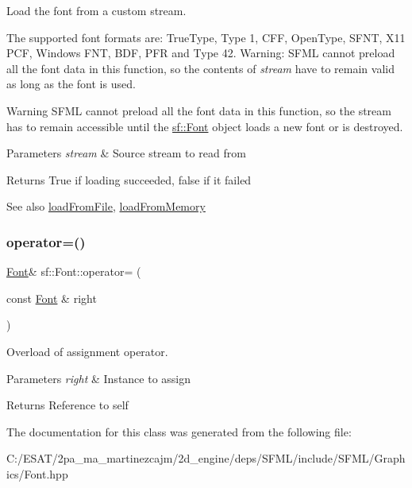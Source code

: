 Load the font from a custom stream. 

The supported font formats are\+: True\+Type, Type 1, C\+FF, Open\+Type, S\+F\+NT, X11 P\+CF, Windows F\+NT, B\+DF, P\+FR and Type 42. Warning\+: S\+F\+ML cannot preload all the font data in this function, so the contents of {\itshape stream} have to remain valid as long as the font is used.

\begin{DoxyWarning}{Warning}
S\+F\+ML cannot preload all the font data in this function, so the stream has to remain accessible until the \hyperlink{classsf_1_1_font}{sf\+::\+Font} object loads a new font or is destroyed.
\end{DoxyWarning}

\begin{DoxyParams}{Parameters}
{\em stream} & Source stream to read from\\
\hline
\end{DoxyParams}
\begin{DoxyReturn}{Returns}
True if loading succeeded, false if it failed
\end{DoxyReturn}
\begin{DoxySeeAlso}{See also}
\hyperlink{classsf_1_1_font_ab020052ef4e01f6c749a85571c0f3fd1}{load\+From\+File}, \hyperlink{classsf_1_1_font_abf2f8d6de31eb4e1db02e061c323e346}{load\+From\+Memory} 
\end{DoxySeeAlso}
\mbox{\label{classsf_1_1_font_a232515549846e3172a514d0b47918399}} 
\subsubsection{\texorpdfstring{operator=()}{operator=()}}
{\footnotesize\ttfamily \hyperlink{classsf_1_1_font}{Font}\& sf\+::\+Font\+::operator= (\begin{DoxyParamCaption}\item[{const \hyperlink{classsf_1_1_font}{Font} \&}]{right }\end{DoxyParamCaption})}



Overload of assignment operator. 


\begin{DoxyParams}{Parameters}
{\em right} & Instance to assign\\
\hline
\end{DoxyParams}
\begin{DoxyReturn}{Returns}
Reference to self 
\end{DoxyReturn}


The documentation for this class was generated from the following file\+:\begin{DoxyCompactItemize}
\item 
C\+:/\+E\+S\+A\+T/2pa\+\_\+ma\+\_\+martinezcajm/2d\+\_\+engine/deps/\+S\+F\+M\+L/include/\+S\+F\+M\+L/\+Graphics/Font.\+hpp\end{DoxyCompactItemize}
